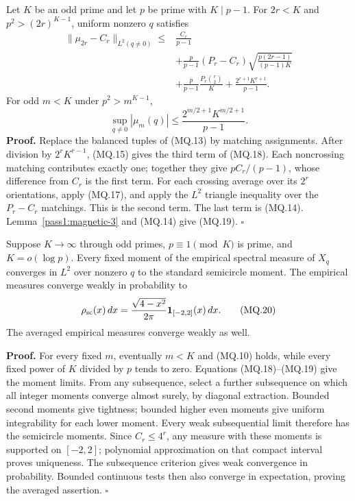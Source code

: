\begin{theorem}\label{pass1:magnetic-4} Let \(K\) be an odd prime and let \(p\) be prime with \(K\mid p-1\). For \(2r<K\) and \(p^2>(2r)^{K-1}\), uniform nonzero \(q\) satisfies \[
\begin{aligned}
 \|\mu_{2r}-C_r\|_{L^2(q\ne0)}\leq{}&\frac{C_r}{p-1}\\
 &+\frac p{p-1}(P_r-C_r)\sqrt{\frac{p(2r-1)}{(p-1)K}}\\
 &+\frac p{p-1}\frac{P_r\binom r2}{K}
       +\frac{2^{r+1}K^{r+1}}{p-1}.
\end{aligned} \tag{MQ.18}
\] For odd \(m<K\) under \(p^2>m^{K-1}\), \[
 \sup_{q\ne0}|\mu_m(q)|\leq\frac{2^{m/2+1}K^{m/2+1}}{p-1}. \tag{MQ.19}
\] \textbf{Proof.} Replace the balanced tuples of (MQ.13) by matching assignments. After division by \(2^rK^{r-1}\), (MQ.15) gives the third term of (MQ.18). Each noncrossing matching contributes exactly one; together they give \(pC_r/(p-1)\), whose difference from \(C_r\) is the first term. For each crossing average over its \(2^r\) orientations, apply (MQ.17), and apply the \(L^2\) triangle inequality over the \(P_r-C_r\) matchings. This is the second term. The last term is (MQ.14). Lemma~\ref{pass1:magnetic-3} and (MQ.14) give (MQ.19). \(\square\)
\end{theorem}

\begin{corollary}\label{pass1:magnetic-5} Suppose \(K\to\infty\) through odd primes, \(p\equiv1\pmod K\) is prime, and \(K=o(\log p)\). Every fixed moment of the empirical spectral measure of \(X_q\) converges in \(L^2\) over nonzero \(q\) to the standard semicircle moment. The empirical measures converge weakly in probability to \[
 \rho_{\rm sc}(x)\,dx=\frac{\sqrt{4-x^2}}{2\pi}\mathbf1_{[-2,2]}(x)\,dx. \tag{MQ.20}
\] The averaged empirical measures converge weakly as well.
\end{corollary}

\textbf{Proof.} For every fixed \(m\), eventually \(m<K\) and (MQ.10) holds, while every fixed power of \(K\) divided by \(p\) tends to zero. Equations (MQ.18)--(MQ.19) give the moment limits. From any subsequence, select a further subsequence on which all integer moments converge almost surely, by diagonal extraction. Bounded second moments give tightness; bounded higher even moments give uniform integrability for each lower moment. Every weak subsequential limit therefore has the semicircle moments. Since \(C_r\leq4^r\), any measure with these moments is supported on \([-2,2]\); polynomial approximation on that compact interval proves uniqueness. The subsequence criterion gives weak convergence in probability. Bounded continuous tests then also converge in expectation, proving the averaged assertion. \(\square\)

